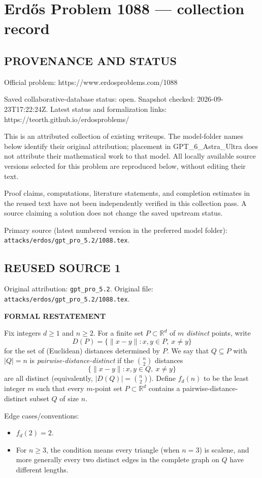\section*{Erd\H{o}s Problem 1088 --- collection record}

\subsection*{PROVENANCE AND STATUS}
Official problem: https://www.erdosproblems.com/1088

Saved collaborative-database status: open.
Snapshot checked: 2026-09-23T17:22:24Z.
Latest status and formalization links: https://teorth.github.io/erdosproblems/

This is an attributed collection of existing writeups. The model-folder names below identify their original attribution; placement in GPT\_6\_Astra\_Ultra does not attribute their mathematical work to that model. All locally available source versions selected for this problem are reproduced below, without editing their text.

Proof claims, computations, literature statements, and completion estimates in the reused text have not been independently verified in this collection pass. A source claiming a solution does not change the saved upstream status.

Primary source (latest numbered version in the preferred model folder): \texttt{attacks/erdos/gpt\_pro\_5.2/1088.tex}.

\subsection*{REUSED SOURCE 1}
Original attribution: \texttt{gpt\_pro\_5.2}.
Original file: \texttt{attacks/erdos/gpt\_pro\_5.2/1088.tex}.


\textbf{FORMAL RESTATEMENT}

Fix integers $d\ge 1$ and $n\ge 2$. For a finite set $P\subset \mathbb{R}^d$ of $m$ \emph{distinct} points, write
\[D(P)=\{\|x-y\| : x,y\in P,\ x\neq y\}\]
for the set of (Euclidean) distances determined by $P$.
We say that $Q\subseteq P$ with $|Q|=n$ is \emph{pairwise-distance-distinct} if the $\binom{n}{2}$ distances
\[\{\|x-y\|: x,y\in Q,\ x\neq y\}
\]
are all distinct (equivalently, $|D(Q)|=\binom{n}{2}$).
Define $f_d(n)$ to be the least integer $m$ such that every $m$-point set $P\subset \mathbb{R}^d$ contains a pairwise-distance-distinct subset $Q$ of size $n$.

Edge cases/conventions:
\begin{itemize}
\item $f_d(2)=2$.
\item For $n\ge 3$, the condition means every triangle (when $n=3$) is scalene, and more generally every two distinct edges in the complete graph on $Q$ have different lengths.
\end{itemize}

